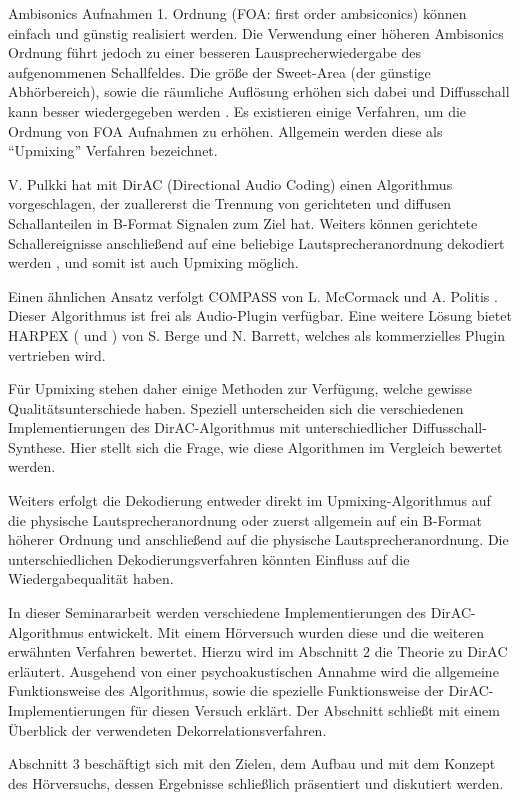 Ambisonics Aufnahmen 1. Ordnung (FOA: first order ambsiconics) können einfach und günstig realisiert werden. 
Die Verwendung einer höheren Ambisonics Ordnung führt jedoch zu einer besseren Lausprecherwiedergabe des aufgenommenen Schallfeldes.
Die größe der Sweet-Area (der günstige Abhörbereich), sowie die räumliche Auflösung erhöhen sich dabei und Diffusschall kann besser wiedergegeben werden \cite{ambi-book}.
Es existieren einige Verfahren, um die Ordnung von FOA Aufnahmen zu erhöhen.
Allgemein werden diese als ``Upmixing'' Verfahren bezeichnet.

V. Pulkki hat mit DirAC (Directional Audio Coding) \cite{pulkki} einen Algorithmus vorgeschlagen, der zuallererst die Trennung von gerichteten und diffusen Schallanteilen in B-Format Signalen zum Ziel hat. Weiters können gerichtete Schallereignisse anschließend auf eine beliebige Lautsprecheranordnung dekodiert werden \cite{spatial-book}, und somit ist auch Upmixing möglich.

Einen ähnlichen Ansatz verfolgt COMPASS von L. McCormack und A. Politis \cite{compy}. Dieser Algorithmus ist frei als Audio-Plugin verfügbar.
Eine weitere Lösung bietet HARPEX (\cite{harpy2} und \cite{harpy}) von S. Berge und N. Barrett, welches als kommerzielles Plugin vertrieben wird.

Für Upmixing stehen daher einige Methoden zur Verfügung, welche gewisse Qualitätsunterschiede haben.
Speziell unterscheiden sich die verschiedenen Implementierungen des DirAC-Algorithmus mit unterschiedlicher Diffusschall-Synthese.
Hier stellt sich die Frage, wie diese Algorithmen im Vergleich bewertet werden.

Weiters erfolgt die Dekodierung entweder direkt im Upmixing-Algorithmus auf die physische Lautsprecheranordnung oder zuerst allgemein auf ein B-Format höherer Ordnung und anschließend auf die physische Lautsprecheranordnung.
Die unterschiedlichen Dekodierungsverfahren könnten Einfluss auf die Wiedergabequalität haben.

In dieser Seminararbeit werden verschiedene Implementierungen des DirAC-Algorithmus entwickelt.
Mit einem Hörversuch wurden diese und die weiteren erwähnten Verfahren bewertet.
Hierzu wird im Abschnitt 2 die Theorie zu DirAC erläutert.
Ausgehend von einer psychoakustischen Annahme wird die allgemeine Funktionsweise des Algorithmus, sowie die spezielle Funktionsweise der DirAC-Implementierungen für diesen Versuch erklärt.
Der Abschnitt schließt mit einem Überblick der verwendeten Dekorrelationsverfahren.

Abschnitt 3 beschäftigt sich mit den Zielen, dem Aufbau und mit dem Konzept des Hörversuchs, dessen Ergebnisse schließlich präsentiert und diskutiert werden.
